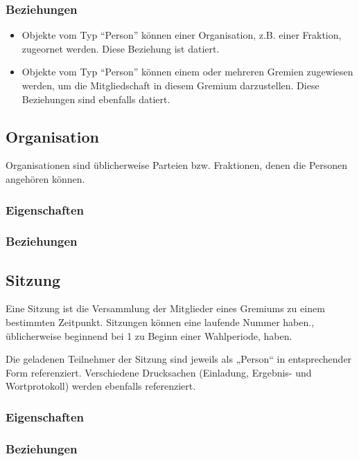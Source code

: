 \subsubsection{Beziehungen}

\begin{itemize}
\item
  Objekte vom Typ ``Person'' können einer Organisation, z.B. einer
  Fraktion, zugeornet werden. Diese Beziehung ist datiert.
\item
  Objekte vom Typ ``Person'' können einem oder mehreren Gremien
  zugewiesen werden, um die Mitgliedschaft in diesem Gremium
  darzustellen. Diese Beziehungen sind ebenfalls datiert.
\end{itemize}

\subsection{Organisation}

Organisationen sind üblicherweise Parteien bzw. Fraktionen, denen die
Personen angehören können.

\subsubsection{Eigenschaften}

\subsubsection{Beziehungen}

\subsection{Sitzung}

Eine Sitzung ist die Versammlung der Mitglieder eines Gremiums zu einem
bestimmten Zeitpunkt. Sitzungen können eine laufende Nummer haben.,
üblicherweise beginnend bei 1 zu Beginn einer Wahlperiode, haben.

Die geladenen Teilnehmer der Sitzung sind jeweils als „Person`` in
entsprechender Form referenziert. Verschiedene Drucksachen (Einladung,
Ergebnis- und Wortprotokoll) werden ebenfalls referenziert.

\subsubsection{Eigenschaften}

\subsubsection{Beziehungen}

